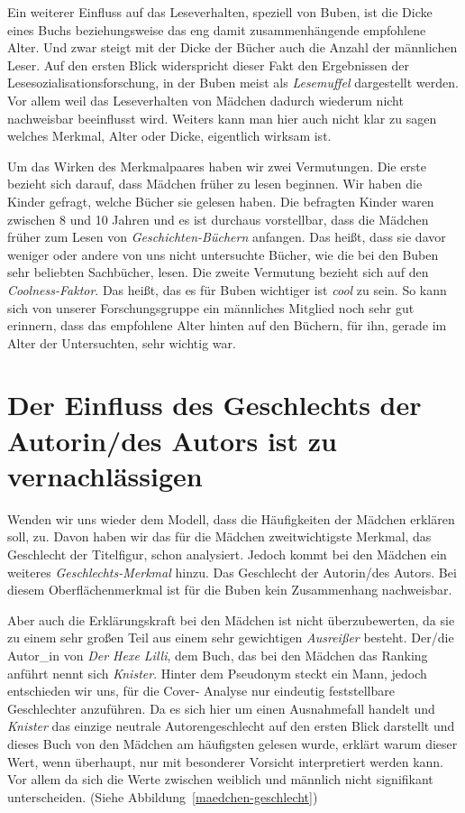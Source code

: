 Ein weiterer Einfluss auf das Leseverhalten, speziell von Buben, ist die
Dicke eines Buchs beziehungsweise das eng damit zusammenhängende
empfohlene Alter. Und zwar steigt mit der Dicke der Bücher auch die
Anzahl der männlichen Leser. Auf den ersten Blick widerspricht dieser
Fakt den Ergebnissen der Lesesozialisationsforschung, in der Buben meist
als \emph{Lesemuffel} dargestellt werden. Vor allem weil das
Leseverhalten von Mädchen dadurch wiederum nicht nachweisbar beeinflusst
wird. Weiters kann man hier auch nicht klar zu sagen welches Merkmal,
Alter oder Dicke, eigentlich wirksam ist.

Um das Wirken des Merkmalpaares haben wir zwei Vermutungen. Die erste
bezieht sich darauf, dass Mädchen früher zu lesen beginnen. Wir haben
die Kinder gefragt, welche Bücher sie gelesen haben. Die befragten
Kinder waren zwischen 8 und 10 Jahren und es ist durchaus vorstellbar,
dass die Mädchen früher zum Lesen von \emph{Geschichten-Büchern}
anfangen. Das heißt, dass sie davor weniger oder andere von uns nicht
untersuchte Bücher, wie die bei den Buben sehr beliebten Sachbücher,
lesen. Die zweite Vermutung bezieht sich auf den \emph{Coolness-Faktor}.
Das heißt, das es für Buben wichtiger ist \emph{cool} zu sein. So kann
sich von unserer Forschungsgruppe ein männliches Mitglied noch sehr gut
erinnern, dass das empfohlene Alter hinten auf den Büchern, für ihn,
gerade im Alter der Untersuchten, sehr wichtig war.

\section{Der Einfluss des Geschlechts der Autorin/des Autors ist zu
vernachlässigen}

Wenden wir uns wieder dem Modell, dass die Häufigkeiten der Mädchen
erklären soll, zu. Davon haben wir das für die Mädchen zweitwichtigste
Merkmal, das Geschlecht der Titelfigur, schon analysiert. Jedoch kommt
bei den Mädchen ein weiteres \emph{Geschlechts-Merkmal} hinzu. Das
Geschlecht der Autorin/des Autors. Bei diesem Oberflächenmerkmal ist für
die Buben kein Zusammenhang nachweisbar.

Aber auch die Erklärungskraft bei den Mädchen ist nicht überzubewerten,
da sie zu einem sehr großen Teil aus einem sehr gewichtigen
\emph{Ausreißer} besteht. Der/die Autor\_in von \emph{Der Hexe Lilli},
dem Buch, das bei den Mädchen das Ranking anführt nennt sich
\emph{Knister}. Hinter dem Pseudonym steckt ein Mann, jedoch entschieden
wir uns, für die Cover- Analyse nur eindeutig feststellbare Geschlechter
anzuführen. Da es sich hier um einen Ausnahmefall handelt und
\emph{Knister} das einzige neutrale Autorengeschlecht auf den ersten
Blick darstellt und dieses Buch von den Mädchen am häufigsten gelesen
wurde, erklärt warum dieser Wert, wenn überhaupt, nur mit besonderer
Vorsicht interpretiert werden kann. Vor allem da sich die Werte zwischen
weiblich und männlich nicht signifikant unterscheiden. (Siehe
Abbildung~\ref{maedchen-geschlecht})


